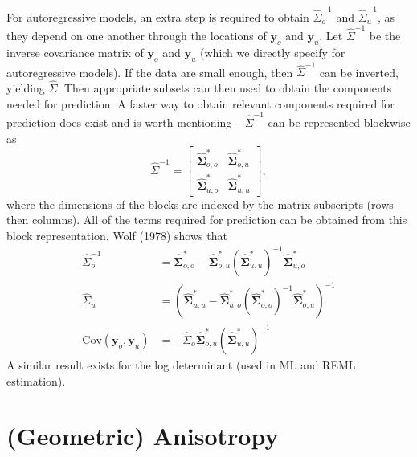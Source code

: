 \documentclass{article}
\begin{document}
For autoregressive models, an extra step is required to obtain
\(\hat{\Sigma}^{-1}_o\) and \(\hat{\Sigma}^{-1}_u\), as they depend on
one another through the locations of \(\mathbf{y}_o\) and
\(\mathbf{y}_u\). Let \(\hat{\Sigma}^{-1}\) be the inverse covariance
matrix of \(\mathbf{y}_o\) and \(\mathbf{y}_u\) (which we directly
specify for autoregressive models). If the data are small enough, then
\(\hat{\Sigma}^{-1}\) can be inverted, yielding \(\hat{\Sigma}\). Then
appropriate subsets can then used to obtain the components needed for
prediction. A faster way to obtain relevant components required for
prediction does exist and is worth mentioning -- \(\hat{\Sigma}^{-1}\)
can be represented blockwise as \begin{equation}\label{eq:auto_hw}
  \hat{\Sigma}^{-1} =
  \begin{bmatrix}
    \mathbf{\hat{\Sigma}}^{*}_{o, o} & \mathbf{\hat{\Sigma}}^{*}_{o, u} \\
    \mathbf{\hat{\Sigma}}^{*}_{u, o} & \mathbf{\hat{\Sigma}}^{*}_{u, u}
  \end{bmatrix},
\end{equation} where the dimensions of the blocks are indexed by the
matrix subscripts (rows then columns). All of the terms required for
prediction can be obtained from this block representation. Wolf (1978)
shows that \begin{equation}\label{eq:hw_forms}
  \begin{split}
    \hat{\Sigma}^{-1}_o & = \mathbf{\hat{\Sigma}}^{*}_{o, o} - \mathbf{\hat{\Sigma}}^{*}_{o, u} (\mathbf{\hat{\Sigma}}^{*}_{u, u})^{-1} \mathbf{\hat{\Sigma}}^{*}_{u, o} \\
    \hat{\Sigma}_u & = (\mathbf{\hat{\Sigma}}^{*}_{u, u} - \mathbf{\hat{\Sigma}}^{*}_{u, o} (\mathbf{\hat{\Sigma}}^{*}_{o, o})^{-1} \mathbf{\hat{\Sigma}}^{*}_{o, u})^{-1} \\
    \text{Cov}(\mathbf{y}_o, \mathbf{y}_u) & = - \hat{\Sigma}_o \mathbf{\hat{\Sigma}}^{*}_{o, u} (\mathbf{\hat{\Sigma}}^{*}_{u, u})^{-1}
  \end{split}
\end{equation} A similar result exists for the log determinant (used in
ML and REML estimation).

\hypertarget{geometric-anisotropy}{%
\section{(Geometric) Anisotropy}\label{geometric-anisotropy}}
\end{document}
